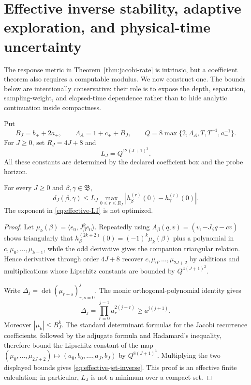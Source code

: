 
\section{Effective inverse stability, adaptive exploration, and physical-time uncertainty}
\label{sec:quantitative-jacobi}

The response metric in Theorem~\ref{thm:jacobi-rate} is intrinsic, but a
coefficient theorem also requires a computable modulus.  We now construct one.
The bounds below are intentionally conservative: their role is to expose the
depth, separation, sampling-weight, and elapsed-time dependence rather than to
hide analytic continuation inside compactness.

Put
\[
 B_J=b_++2a_+,
 \qquad \Lambda_A=1+c_++B_J,
 \qquad Q=8\max\{2,\Lambda_A,T,T^{-1},a_-^{-1}\}.
\]
For \(J\ge0\), set \(R_J=4J+8\) and
\begin{equation}
 L_J=Q^{12(J+1)^3}.
 \label{eq:effective-LJ}
\end{equation}
All these constants are determined by the declared coefficient box and the
probe horizon.

\begin{lemma}
\label{lem:effective-response-jet}
For every \(J\ge0\) and \(\beta,\gamma\in\mathfrak B\),
\begin{equation}
 d_J(\beta,\gamma)
 \le L_J\max_{0\le r\le R_J}
       |h_\beta^{(r)}(0)-h_\gamma^{(r)}(0)|.
 \label{eq:effective-jet-inverse}
\end{equation}
The exponent in \eqref{eq:effective-LJ} is not optimized.
\end{lemma}

\begin{proof}
Let \(\mu_k(\beta)=\langle e_0,J_\beta^ke_0\rangle\).  Repeatedly using
\(A_\beta(q,v)=(v,-J_\beta q-cv)\) shows triangularly that
\(h_\beta^{(2k+2)}(0)=(-1)^k\mu_k(\beta)\) plus a polynomial in
\(c,\mu_0,\ldots,\mu_{k-1}\), while the odd derivative gives the companion
triangular relation.  Hence derivatives through order \(4J+8\) recover
\(c,\mu_0,\ldots,\mu_{2J+2}\) by additions and multiplications whose
Lipschitz constants are bounded by \(Q^{4(J+1)^2}\).

Write
\(\Delta_j=\det(\mu_{r+s})_{r,s=0}^j\).  The monic orthogonal-polynomial
identity gives
\begin{equation}
 \Delta_j=\prod_{r=0}^{j-1}a_r^{2(j-r)}
 \ge a_-^{j(j+1)}.
 \label{eq:hankel-determinant-lower}
\end{equation}
Moreover \(|\mu_k|\le B_J^k\).  The standard determinant formulas for the
Jacobi recurrence coefficients, followed by the adjugate formula and
Hadamard's inequality, therefore bound the Lipschitz constant of the map
\((\mu_0,\ldots,\mu_{2J+2})\mapsto(a_0,b_0,\ldots,a_J,b_J)\) by
\(Q^{8(J+1)^3}\).  Multiplying the two displayed bounds gives
\eqref{eq:effective-jet-inverse}.  This proof is an effective finite
calculation; in particular, \(L_J\) is not a minimum over a compact set.
\end{proof}

